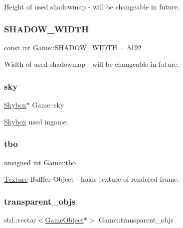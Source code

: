 Height of used shadowmap -\/ will be changeable in future. 

\mbox{\label{class_game_abf4d8e38c95fc6e1351e6dd85a19429f}} 
\subsubsection{\texorpdfstring{SHADOW\_WIDTH}{SHADOW\_WIDTH}}
{\footnotesize\ttfamily const int Game\+::\+S\+H\+A\+D\+O\+W\+\_\+\+W\+I\+D\+TH = 8192\hspace{0.3cm}{\ttfamily [protected]}}



Width of used shadowmap -\/ will be changeable in future. 

\mbox{\label{class_game_a46b9b13579445bc071f6cba24953b531}} 
\subsubsection{\texorpdfstring{sky}{sky}}
{\footnotesize\ttfamily \mbox{\hyperlink{class_skybox}{Skybox}}$\ast$ Game\+::sky\hspace{0.3cm}{\ttfamily [protected]}}



\mbox{\hyperlink{class_skybox}{Skybox}} used ingame. 

\mbox{\label{class_game_af04f4198d017854557726ab48726e709}} 
\subsubsection{\texorpdfstring{tbo}{tbo}}
{\footnotesize\ttfamily unsigned int Game\+::tbo\hspace{0.3cm}{\ttfamily [protected]}}



\mbox{\hyperlink{class_texture}{Texture}} Bufffer Object -\/ holds texture of rendered frame. 

\mbox{\label{class_game_a29149a40296ca49ec4aacdad04716fe4}} 
\subsubsection{\texorpdfstring{transparent\_objs}{transparent\_objs}}
{\footnotesize\ttfamily std\+::vector$<$\mbox{\hyperlink{class_game_object}{Game\+Object}}$\ast$$>$ Game\+::transparent\+\_\+objs}



